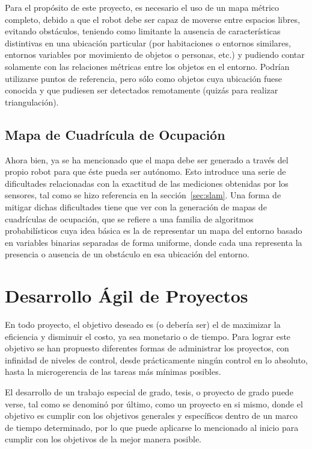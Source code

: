 Para el propósito de este proyecto, es necesario el uso de un mapa métrico completo, debido a que el robot debe ser capaz de moverse entre espacios libres, evitando obstáculos, teniendo como limitante la ausencia de características distintivas en una ubicación particular (por habitaciones o entornos similares, entornos variables por movimiento de objetos o personas, etc.) y pudiendo contar solamente con las relaciones métricas entre los objetos en el entorno. Podrían utilizarse puntos de referencia, pero sólo como objetos cuya ubicación fuese conocida y que pudiesen ser detectados remotamente (quizás para realizar triangulación).

\subsection{Mapa de Cuadrícula de Ocupación}

Ahora bien, ya se ha mencionado que el mapa debe ser generado a través del propio robot para que éste pueda ser autónomo. Esto introduce una serie de dificultades relacionadas con la exactitud de las mediciones obtenidas por los sensores, tal como se hizo referencia en la sección~\ref{sec:slam}. Una forma de mitigar dichas dificultades tiene que ver con la generación de mapas de cuadrículas de ocupación, que se refiere a una familia de algoritmos probabilísticos cuya idea básica es la de representar un mapa del entorno basado en variables binarias separadas de forma uniforme, donde cada una representa la presencia o ausencia de un obstáculo en esa ubicación del entorno.

\section{Desarrollo Ágil de Proyectos}

En todo proyecto, el objetivo deseado es (o debería ser) el de maximizar la eficiencia y disminuir el costo, ya sea monetario o de tiempo. Para lograr este objetivo se han propuesto diferentes formas de administrar los proyectos, con infinidad de niveles de control, desde prácticamente ningún control en lo absoluto, hasta la microgerencia de las tareas más mínimas posibles.

El desarrollo de un trabajo especial de grado, tesis, o proyecto de grado puede verse, tal como se denominó por último, como un proyecto en si mismo, donde el objetivo es cumplir con los objetivos generales y específicos dentro de un marco de tiempo determinado, por lo que puede aplicarse lo mencionado al inicio para cumplir con los objetivos de la mejor manera posible.

